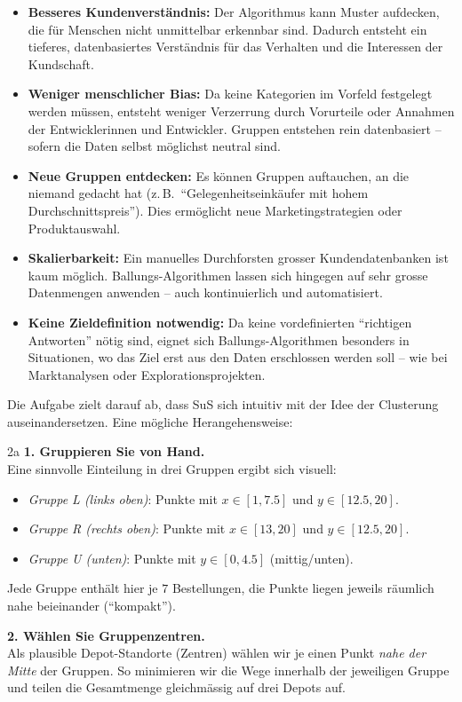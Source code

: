 \begin{aufgabe}{1}
\begin{itemize}
\begin{itemize}
  \item \textbf{Besseres Kundenverständnis:} Der Algorithmus kann Muster aufdecken, die für Menschen nicht unmittelbar erkennbar sind. Dadurch entsteht ein tieferes, datenbasiertes Verständnis für das Verhalten und die Interessen der Kundschaft.

  \item \textbf{Weniger menschlicher Bias:} Da keine Kategorien im Vorfeld festgelegt werden müssen, entsteht weniger Verzerrung durch Vorurteile oder Annahmen der Entwicklerinnen und Entwickler. Gruppen entstehen rein datenbasiert – sofern die Daten selbst möglichst neutral sind.

  \item \textbf{Neue Gruppen entdecken:} Es können Gruppen auftauchen, an die niemand gedacht hat (z.\,B.\ ``Gelegenheitseinkäufer mit hohem Durchschnittspreis''). Dies ermöglicht neue Marketingstrategien oder Produktauswahl.

  \item \textbf{Skalierbarkeit:} Ein manuelles Durchforsten grosser Kundendatenbanken ist kaum möglich. Ballungs-Algorithmen lassen sich hingegen auf sehr grosse Datenmengen anwenden – auch kontinuierlich und automatisiert.

  \item \textbf{Keine Zieldefinition notwendig:} Da keine vordefinierten ``richtigen Antworten'' nötig sind, eignet sich Ballungs-Algorithmen besonders in Situationen, wo das Ziel erst aus den Daten erschlossen werden soll – wie bei Marktanalysen oder Explorationsprojekten.
\end{itemize}
\end{itemize}
\end{aufgabe}

Die Aufgabe zielt darauf ab, dass SuS sich intuitiv mit der Idee der Clusterung auseinandersetzen. Eine mögliche Herangehensweise:


\begin{aufgabe}{2a}
\textbf{1. Gruppieren Sie von Hand.}\\
Eine sinnvolle Einteilung in drei Gruppen ergibt sich visuell:
\begin{itemize}
  \item \emph{Gruppe L (links oben)}: Punkte mit $x\in[1,7.5]$ und $y\in[12.5,20]$.
  \item \emph{Gruppe R (rechts oben)}: Punkte mit $x\in[13,20]$ und $y\in[12.5,20]$.
  \item \emph{Gruppe U (unten)}: Punkte mit $y\in[0,4.5]$ (mittig/unten).
\end{itemize}
Jede Gruppe enthält hier je $7$ Bestellungen, die Punkte liegen jeweils räumlich nahe beieinander
(``kompakt'').

\vspace{0.5em}
\textbf{2. Wählen Sie Gruppenzentren.}\\
Als plausible Depot-Standorte (Zentren) wählen wir je einen Punkt \emph{nahe der Mitte} der Gruppen. So minimieren wir die Wege innerhalb der jeweiligen Gruppe und teilen die Gesamtmenge
gleichmässig auf drei Depots auf.
\end{aufgabe}

